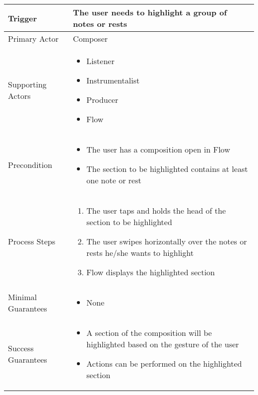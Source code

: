 \begin{longtable}{|X|X|}
\hline
Trigger & 
The user needs to highlight a group of notes or rests \\
\hline
Primary Actor & 
Composer \\
\hline
Supporting Actors & 
\begin{itemize}
\item Listener
\item Instrumentalist
\item Producer
\item Flow
\end{itemize} \\
\hline
Precondition & 
\begin{itemize}
\item The user has a composition open in Flow
\item The section to be highlighted contains at least one note or rest
\end{itemize} \\
\hline
Process Steps & 
\begin{enumerate}
\item The user taps and holds the head of the section to be highlighted
\item The user swipes horizontally over the notes or rests he/she wants to highlight
\item Flow displays the highlighted section
\end{enumerate} \\
\hline
Minimal Guarantees & 
\begin{itemize}
  \item None
\end{itemize} \\
\hline
Success Guarantees & 
\begin{itemize}
  \item A section of the composition will be highlighted based on the gesture of the user 
  \item Actions can be performed on the highlighted section
\end{itemize} \\
\hline
\end{longtable}
